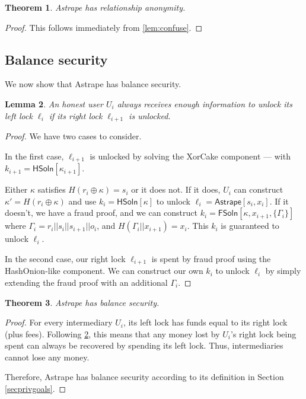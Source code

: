 \documentclass[USenglish,oneside,twocolumn]{article}
\newtheorem{theorem}{Theorem}[section]
\newtheorem{lemma}[theorem]{Lemma}
\begin{document}
\begin{theorem}
    Astrape has relationship anonymity.
\end{theorem}

\begin{proof}
    This follows immediately from \ref{lem:confuse}.
\end{proof}

\subsection{Balance security}

We now show that Astrape has balance security.

\begin{lemma}\label{lem:balsec}
    An honest user $U_i$ always receives enough information to unlock its left lock $\ell_{i}$ if its right lock $\ell_{i+1}$ is unlocked.
\end{lemma}

\begin{proof}
    We have two cases to consider.

    In the first case, $\ell_{i+1}$ is unlocked by solving the XorCake component --- with $k_{i+1} = \mathsf{HSoln}[\kappa_{i+1}]$.

    Either $\kappa$ satisfies $H(r_i \oplus \kappa) = s_i$ or it does not. If it does, $U_i$ can construct $\kappa' = H(r_i \oplus \kappa)$ and use $k_i=\mathsf{HSoln}[\kappa]$ to unlock $\ell_i = \mathsf{Astrape}[s_i,x_i]$. If it doesn't, we have a fraud proof, and we can construct $k_i=\mathsf{FSoln}[\kappa, x_{i+1}, \{ \Gamma_i \}]$ where $\Gamma_i = r_i||s_i||s_{i+1}||o_i$, and $H(\Gamma_i||x_{i+1})=x_i$. This $k_i$ is guaranteed to unlock $\ell_i$.

    In the second case, our right lock $\ell_{i+1}$ is spent by fraud proof using the HashOnion-like component. We can construct our own $k_i$ to unlock $\ell_i$ by simply extending the fraud proof with an additional $\Gamma_i$.
\end{proof}

\begin{theorem}
    Astrape has balance security.
\end{theorem}

\begin{proof}
    For every intermediary $U_i$, its left lock has funds equal to its right lock (plus fees). Following \ref{lem:balsec}, this means that any money lost by $U_i$'s right lock being spent can always be recovered by spending its left lock. Thus, intermediaries cannot lose any money.

    Therefore, Astrape has balance security according to its definition in Section \ref{secprivgoals}.
\end{proof}
\end{document}
